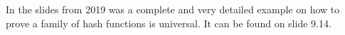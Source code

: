 \documentclass[english]{panikzettel}
\begin{document}
In the slides from 2019 was a complete and very detailed example on how to prove a family of hash functions is universal. It can be found on slide 9.14.

%
\end{document}
